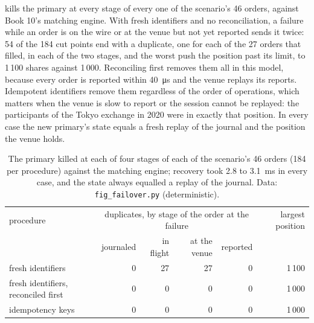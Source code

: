\label{lst:ll:resilience:resend}

 kills the primary at every stage of every one of the scenario's 46 orders, against Book 10's
matching engine. With fresh identifiers and no reconciliation, a failure while an order is on the wire or at the venue but not
yet reported sends it twice: 54 of the 184 cut points end with a duplicate, one for each of the 27 orders that filled, in each
of the two stages, and the worst push the position past its limit, to 1\,100 shares against 1\,000. Reconciling first
removes them all in this model, because every order is reported within \qty{40}{\micro\second} and the venue replays its
reports. Idempotent identifiers remove them regardless of the order of operations, which matters when the venue is slow to
report or the session cannot be replayed: the participants of the Tokyo exchange in 2020 were in exactly that position. In
every case the new primary's state equals a fresh replay of the journal and the position the venue holds.

\begin{table}[ht]
\centering\small
\begin{tabular}{lrrrrr}
\toprule
procedure & \multicolumn{4}{c}{duplicates, by stage of the order at the failure} & largest position \\
 & journaled & in flight & at the venue & reported & \\
\midrule
fresh identifiers & 0 & 27 & 27 & 0 & 1\,100 \\
fresh identifiers, reconciled first & 0 & 0 & 0 & 0 & 1\,000 \\
idempotency keys & 0 & 0 & 0 & 0 & 1\,000 \\
\bottomrule
\end{tabular}
\caption{The primary killed at each of four stages of each of the scenario's 46 orders (184  per procedure) against
the matching engine; recovery took 2.8 to \qty{3.1}{\milli\second} in every case, and the state always equalled a replay of the
journal. Data: \texttt{fig\_failover.py} (deterministic).}\label{tab:ll:resilience:cuts}
\end{table}

